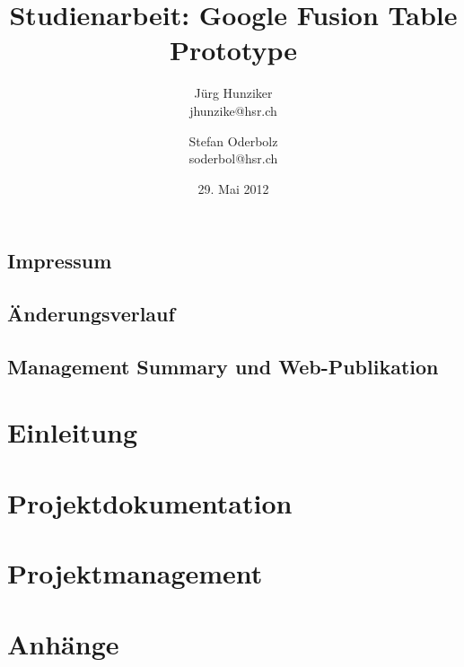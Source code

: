 


\title{Studienarbeit: Google Fusion Table Prototype}
\author{Jürg Hunziker\\jhunzike@hsr.ch
		\and
		Stefan Oderbolz\\soderbol@hsr.ch}

\date{29. Mai 2012}
\maketitle



\listoftodos

\chapter*{Impressum}


\chapter*{Änderungsverlauf}




\chapter*{Management Summary und Web-Publikation}


\tableofcontents

\part{Einleitung}


\part{Projektdokumentation}


\part{Projektmanagement}


\part{Anhänge}

\printglossary[style=altlist,title=Glossar,toctitle=Glossar]




